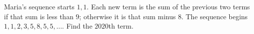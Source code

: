 Maria's sequence starts $1,1$. Each new term is the sum of the previous two terms if that sum is less than $9$; otherwise it is that sum minus $8$. The sequence begins $1,1,2,3,5,8,5,5,\dots$. Find the $2020$th term.
